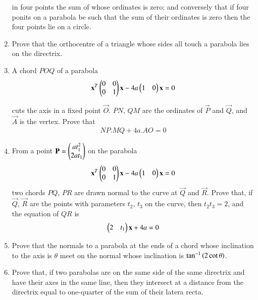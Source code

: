 \begin{enumerate}[label=\arabic*.,ref=\thesubsection.\theenumi]
 in four points the sum of
whose ordinates is zero; and conversely that if four ponits on a parabola be
such that the sum of their ordinates is zero then the four points lie on a circle.
\item Prove that the orthocentre of a triangle whose sides all touch a parabola
lies on the directrix.
\item A chord $POQ$ of a parabola 
\begin{align}
\mathbf{x}^T\begin{pmatrix}0 & 0\\0 & 1\end{pmatrix}\mathbf{x}-4a\begin{pmatrix}1 & 0 \end{pmatrix}\mathbf{x}= 0 
\end{align}

 cuts the axis in a fixed point $\vec{O}$.  $PN$, $QM$ are the ordinates of $\vec{P}$ and $\vec{Q}$,
and $\vec{A}$ is the vertex.  Prove that
\begin{align}
NP.MQ+4a.AO=0
\end{align}
\item From a point $\mathbf{P}= \begin{pmatrix}at_1^2\\2at_1\end{pmatrix}$ on the parabola 
\begin{align}
\mathbf{x}^T\begin{pmatrix}0 & 0\\0 & 1\end{pmatrix}\mathbf{x}-4a\begin{pmatrix}1 & 0 \end{pmatrix}\mathbf{x}= 0 
\end{align}
 two chords $PQ$, $PR$ are drawn normal to the curve at $\vec{Q}$
and $\vec{R}$.  Prove that, if $\vec{Q}$, $\vec{R}$ are the points with parameters $t_2$, $t_3$ on the curve, then $t_2t_3=2$, and the equation
of $QR$ is
\begin{align}
\begin{pmatrix}2 & t_1\end{pmatrix}\mathbf{x} + 4a= 0
\end{align}
\item Prove that the normals to a parabola at the ends of a chord whose inclination to the axis is $\theta$ meet on the
normal whose inclination is $\tan^{-1}\left(2\cot\theta\right)$.
\item Prove that, if two parabolas are on the same side of the same directrix and have their axes in the same line, then they intersect
at a distance from the directrix equal to one-quarter of the sum of their latera recta.

\end{enumerate}
